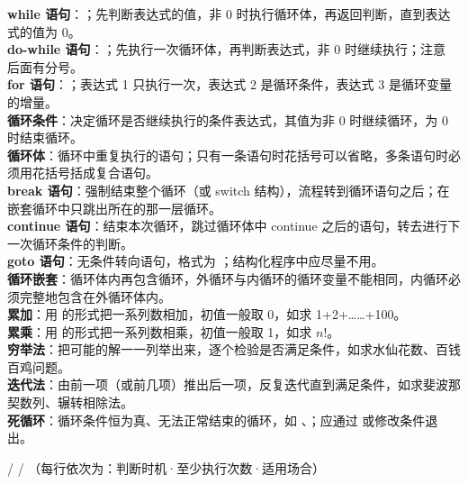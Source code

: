 \documentclass[a4paper,11pt]{article}
\begin{document}
\begin{keyterms}
\textbf{while 语句}：；先判断表达式的值，非 0 时执行循环体，再返回判断，直到表达式的值为 0。\\
\textbf{do-while 语句}：；先执行一次循环体，再判断表达式，非 0 时继续执行；注意  后面有分号。\\
\textbf{for 语句}：；表达式 1 只执行一次，表达式 2 是循环条件，表达式 3 是循环变量的增量。\\
\textbf{循环条件}：决定循环是否继续执行的条件表达式，其值为非 0 时继续循环，为 0 时结束循环。\\
\textbf{循环体}：循环中重复执行的语句；只有一条语句时花括号可以省略，多条语句时必须用花括号括成复合语句。\\
\textbf{break 语句}：强制结束整个循环（或 switch 结构），流程转到循环语句之后；在嵌套循环中只跳出所在的那一层循环。\\
\textbf{continue 语句}：结束本次循环，跳过循环体中 continue 之后的语句，转去进行下一次循环条件的判断。\\
\textbf{goto 语句}：无条件转向语句，格式为 ；结构化程序中应尽量不用。\\
\textbf{循环嵌套}：循环体内再包含循环，外循环与内循环的循环变量不能相同，内循环必须完整地包含在外循环体内。\\
\textbf{累加}：用  的形式把一系列数相加，初值一般取 0，如求 1+2+……+100。\\
\textbf{累乘}：用  的形式把一系列数相乘，初值一般取 1，如求 $n!$。\\
\textbf{穷举法}：把可能的解一一列举出来，逐个检验是否满足条件，如求水仙花数、百钱百鸡问题。\\
\textbf{迭代法}：由前一项（或前几项）推出后一项，反复迭代直到满足条件，如求斐波那契数列、辗转相除法。\\
\textbf{死循环}：循环条件恒为真、无法正常结束的循环，如 、；应通过  或修改条件退出。
\end{keyterms}

\begin{contrast}{ /  / （每行依次为：判断时机·至少执行次数·适用场合）}
\end{contrast}
\end{document}
